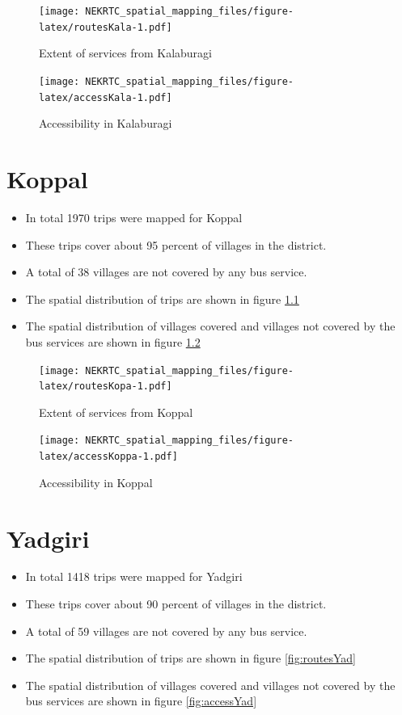 \documentclass[
]{book}
\providecommand{\tightlist}{%
  \setlength{\itemsep}{0pt}\setlength{\parskip}{0pt}}
\begin{document}
\begin{figure}
\centering
\texttt{[image: NEKRTC\_spatial\_mapping\_files/figure-latex/routesKala-1.pdf]}
\caption{\label{fig:routesKala}Extent of services from Kalaburagi}
\end{figure}

\begin{figure}
\centering
\texttt{[image: NEKRTC\_spatial\_mapping\_files/figure-latex/accessKala-1.pdf]}
\caption{\label{fig:accessKala}Accessibility in Kalaburagi}
\end{figure}

\hypertarget{koppal}{%
\chapter{Koppal}\label{koppal}}

\begin{itemize}
\tightlist
\item
  In total 1970 trips were mapped for Koppal
\item
  These trips cover about 95 percent of villages in the district.
\item
  A total of 38 villages are not covered by any bus service.
\item
  The spatial distribution of trips are shown in figure \ref{fig:routesKopa}
\item
  The spatial distribution of villages covered and villages not covered by the bus services are shown in figure \ref{fig:accessKoppa}
\end{itemize}

\begin{figure}
\centering
\texttt{[image: NEKRTC\_spatial\_mapping\_files/figure-latex/routesKopa-1.pdf]}
\caption{\label{fig:routesKopa}Extent of services from Koppal}
\end{figure}

\begin{figure}
\centering
\texttt{[image: NEKRTC\_spatial\_mapping\_files/figure-latex/accessKoppa-1.pdf]}
\caption{\label{fig:accessKoppa}Accessibility in Koppal}
\end{figure}

\hypertarget{yadgiri}{%
\chapter{Yadgiri}\label{yadgiri}}

\begin{itemize}
\tightlist
\item
  In total 1418 trips were mapped for Yadgiri
\item
  These trips cover about 90 percent of villages in the district.
\item
  A total of 59 villages are not covered by any bus service.
\item
  The spatial distribution of trips are shown in figure \ref{fig:routesYad}
\item
  The spatial distribution of villages covered and villages not covered by the bus services are shown in figure \ref{fig:accessYad}
\end{itemize}
\end{document}
